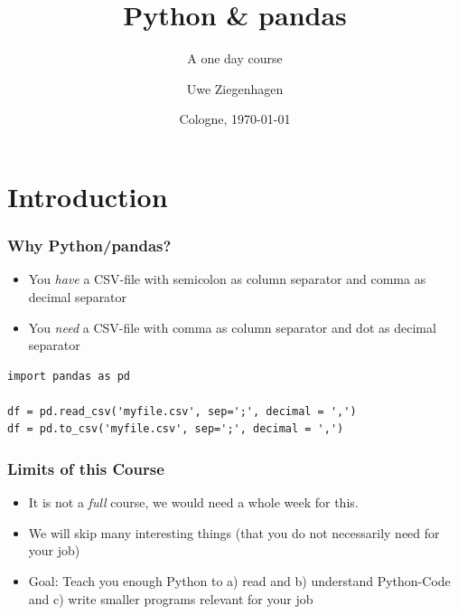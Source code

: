 \documentclass[ngerman]{beamer}
\author{Uwe Ziegenhagen}
\title{Python \& pandas}
\subtitle{A one day course}
\institute{\url{github.com/UweZiegenhagen/OneDayPythonPandasCourse}}
\date{Cologne, \today}
\begin{document}
\begin{frame}

\maketitle

\end{frame}

\section{Introduction}

\begin{frame}[fragile]
\frametitle{Why Python/pandas?}

\begin{itemize}
	\item You \textit{have} a CSV-file with semicolon as column separator and comma as decimal separator
	\item You \textit{need} a CSV-file with comma as column separator and dot as decimal separator
\end{itemize}

\begin{lstlisting}
import pandas as pd

df = pd.read_csv('myfile.csv', sep=';', decimal = ',')
df = pd.to_csv('myfile.csv', sep=';', decimal = ',')
\end{lstlisting}


\end{frame}

\begin{frame}
\frametitle{Limits of this Course}

\begin{itemize}
\item It is not a \textit{full} course, we would need a whole week for this.
\item We will skip many interesting things (that you do not necessarily need for your job)
\item Goal: Teach you enough Python to a) read and b) understand Python-Code and c) write smaller programs relevant for your job 
\end{itemize}
\end{frame}



\begin{frame}

\tableofcontents

\end{frame}
\end{document}
